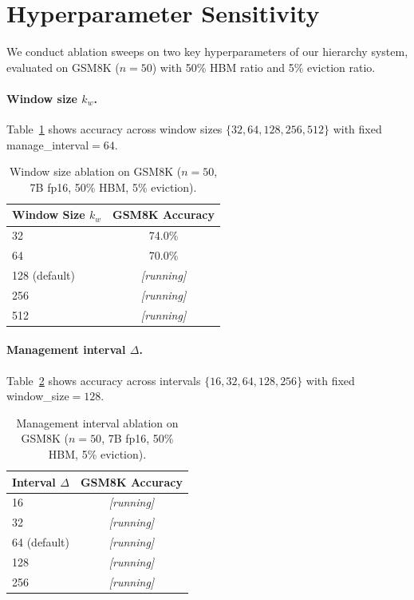 \documentclass{article}
\begin{document}



\newpage
\appendix
\section{Hyperparameter Sensitivity}
\label{app:sensitivity}

We conduct ablation sweeps on two key hyperparameters of our hierarchy system, evaluated on GSM8K ($n{=}50$) with 50\% HBM ratio and 5\% eviction ratio.

\paragraph{Window size $k_w$.}
Table~\ref{tab:window_sweep} shows accuracy across window sizes $\{32, 64, 128, 256, 512\}$ with fixed manage\_interval$=64$.

\begin{table}[h]
\centering
\caption{Window size ablation on GSM8K ($n=50$, 7B fp16, 50\% HBM, 5\% eviction).}
\label{tab:window_sweep}
\vskip 0.1in
\begin{tabular}{lc}
\toprule
\textbf{Window Size $k_w$} & \textbf{GSM8K Accuracy} \\
\midrule
32 & 74.0\% \\
64 & 70.0\% \\
128 (default) & \textit{[running]} \\
256 & \textit{[running]} \\
512 & \textit{[running]} \\
\bottomrule
\end{tabular}
\end{table}

\paragraph{Management interval $\Delta$.}
Table~\ref{tab:interval_sweep} shows accuracy across intervals $\{16, 32, 64, 128, 256\}$ with fixed window\_size$=128$.

\begin{table}[h]
\centering
\caption{Management interval ablation on GSM8K ($n=50$, 7B fp16, 50\% HBM, 5\% eviction).}
\label{tab:interval_sweep}
\vskip 0.1in
\begin{tabular}{lc}
\toprule
\textbf{Interval $\Delta$} & \textbf{GSM8K Accuracy} \\
\midrule
16 & \textit{[running]} \\
32 & \textit{[running]} \\
64 (default) & \textit{[running]} \\
128 & \textit{[running]} \\
256 & \textit{[running]} \\
\bottomrule
\end{tabular}
\end{table}
\end{document}
